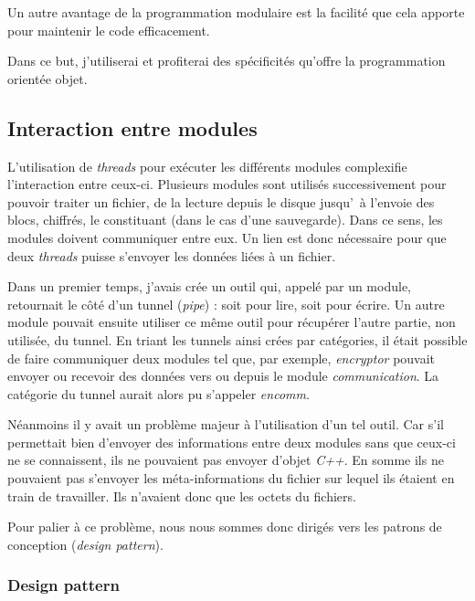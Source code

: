 \documentclass[a4paper,10pt, twoside]{report}
\begin{document}
\begin{spacing}{1.2}
Un autre avantage de la programmation modulaire est la facilit\'e que cela
apporte pour maintenir le code efficacement.

Dans ce but, j'utiliserai et profiterai des sp\'ecificit\'es qu'offre la
programmation orient\'ee objet.

\subsection{Interaction entre modules}

L'utilisation de \textit{threads} pour ex\'ecuter les diff\'erents modules
complexifie l'interaction entre ceux-ci. Plusieurs modules sont utilis\'es
successivement pour pouvoir traiter un fichier, de la lecture depuis le disque
jusqu'\ \`a l'envoie des blocs, chiffr\'es, le constituant (dans le cas d'une
sauvegarde). Dans ce sens, les modules doivent communiquer entre eux. Un lien
est donc n\'ecessaire pour que deux \textit{threads} puisse s'envoyer les
donn\'ees li\'ees \`a un fichier.

Dans un premier temps, j'avais cr\'ee un outil qui, appel\'e par un module,
retournait le c\^ot\'e d'un tunnel (\textit{pipe}) : soit pour lire, soit pour
\'ecrire. Un autre module pouvait ensuite utiliser ce m\^eme outil pour
r\'ecup\'erer l'autre partie, non utilis\'ee, du tunnel. En triant les
tunnels ainsi cr\'ees par cat\'egories, il \'etait possible de faire communiquer
deux modules tel que, par exemple, \textit{encryptor} pouvait envoyer ou
recevoir des donn\'ees vers ou depuis le module \textit{communication}. La
cat\'egorie du tunnel aurait alors pu s'appeler \textit{encomm}.

N\'eanmoins il y avait un probl\`eme majeur \`a l'utilisation d'un tel outil.
Car s'il permettait bien d'envoyer des informations entre deux modules sans
que ceux-ci ne se connaissent, ils ne pouvaient pas envoyer d'objet
\textit{C++}. En somme ils ne pouvaient pas s'envoyer les m\'eta-informations
du fichier sur lequel ils \'etaient en train de travailler. Ils n'avaient
donc que les octets du fichiers.

Pour palier \`a ce probl\`eme, nous nous sommes donc dirig\'es vers les patrons
de conception (\textit{design pattern}).

\subsubsection{Design pattern}

\end{spacing}
\end{document}
